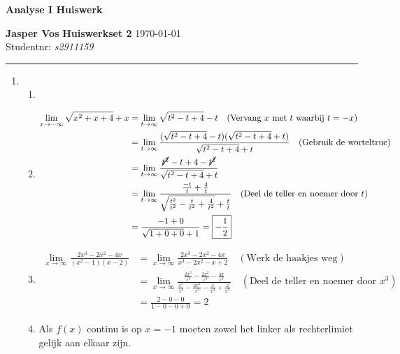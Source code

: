 \documentclass{article}
\begin{document}
{\Large \textbf{Analyse I Huiswerk}}

\bigskip

\textbf{Jasper Vos} \hfill \textbf{Huiswerkset 2} \hfill \today \\
Studentnr: \emph{s2911159} 

\rule{\textwidth}{2pt}

\bigskip

\begin{enumerate}
    \item
    \begin{enumerate}[label=\alph*)]
        \item
            
        \item
            \begin{align*}
                \lim_{x \rightarrow -\infty} \sqrt{x^2+x+4} + x &= \lim_{t \rightarrow \infty} \sqrt{t^2-t+4}-t \quad (\text{Vervang $x$ met $t$ waarbij $t=-x$})\\
                &= \lim_{t \rightarrow \infty} \frac{(\sqrt{t^2-t+4}-t)(\sqrt{t^2-t+4}+t)}{\sqrt{t^2-t+4}+t} \quad (\text{Gebruik de worteltruc})\\ 
                &= \lim_{t \rightarrow \infty} \frac{\cancel{t^2}-t+4-\cancel{t^2}}{\sqrt{t^2-t+4}+t} \\
                &= \lim_{t \rightarrow \infty} \frac{\frac{-t}{t}+\frac{4}{t}}{\sqrt{\frac{t^2}{t^2}-\frac{t}{t^2}+\frac{4}{t^2}} + \frac{t}{t}} \quad (\text{Deel de teller en noemer door $t$})\\
                &= \frac{-1 + 0}{\sqrt{1+0+0}+1} = \boxed{-\frac{1}{2}}
            \end{align*}
        \item
            \begin{align*}
                \lim_{x \rightarrow \infty} \frac{2x^3-2x^2-4x}{(x^2-1)(x-2)} &= \lim_{x \rightarrow \infty} \frac{2x^3-2x^2-4x}{x^3-2x^2-x+2} \quad (\text{Werk de haakjes weg}) \\
                &= \lim_{x \rightarrow \infty} \frac{\frac{2x^3}{x^3}-\frac{2x^2}{x^3}-\frac{4x}{x^3}}{\frac{x^3}{x^3}-\frac{2x^2}{x^3}-\frac{x}{x^3}+\frac{2}{x^3}} \quad (\text{Deel de teller en noemer door $x^3$})\\
                &= \frac{2-0-0}{1-0-0+0} = \boxed{2}
            \end{align*}
        \item
            Als $f(x)$ continu is op $x=-1$ moeten zowel het linker als rechterlimiet gelijk aan elkaar zijn. 

\end{enumerate}
\end{enumerate}
\end{document}
